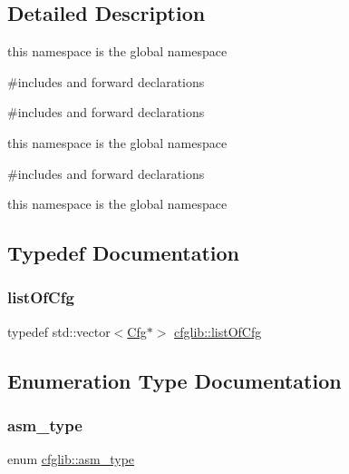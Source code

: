 \subsection{Detailed Description}
this namespace is the global namespace

\#includes and forward declarations

\#includes and forward declarations

this namespace is the global namespace

\#includes and forward declarations

this namespace is the global namespace 

\subsection{Typedef Documentation}
\mbox{\label{namespacecfglib_a6d40ca49d73d6bd01cf38af88645373a}} 
\subsubsection{\texorpdfstring{list\+Of\+Cfg}{listOfCfg}}
{\footnotesize\ttfamily typedef std\+::vector$<$\hyperlink{classcfglib_1_1Cfg}{Cfg}$\ast$$>$ \hyperlink{namespacecfglib_a6d40ca49d73d6bd01cf38af88645373a}{cfglib\+::list\+Of\+Cfg}}



\subsection{Enumeration Type Documentation}
\mbox{\label{namespacecfglib_a5ae32d51cf4ff1db5485367eab63a500}} 
\subsubsection{\texorpdfstring{asm\+\_\+type}{asm\_type}}
{\footnotesize\ttfamily enum \hyperlink{namespacecfglib_a5ae32d51cf4ff1db5485367eab63a500}{cfglib\+::asm\+\_\+type}}

